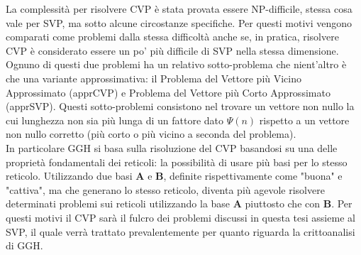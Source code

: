 La complessità per risolvere CVP è stata provata essere NP-difficile\cite{CVP-NP09}, stessa
cosa vale per SVP, ma sotto alcune circostanze specifiche\cite{SVP-NP02}. Per questi motivi vengono
comparati come problemi dalla stessa difficoltà anche se, in pratica, risolvere CVP è considerato 
essere un po' più difficile di SVP nella stessa dimensione.
Ognuno di questi due problemi ha un relativo sotto-problema che nient'altro è che una 
variante approssimativa: il Problema del Vettore più Vicino Approssimato (apprCVP) 
e Problema del Vettore più Corto Approssimato  (apprSVP). Questi sotto-problemi consistono nel 
trovare un vettore non nullo la cui lunghezza non sia più lunga di un fattore dato $\Psi(n)$
rispetto a un vettore non nullo corretto (più corto o più vicino a seconda del problema).
\\
In particolare GGH si basa sulla risoluzione del CVP basandosi su una delle proprietà
fondamentali dei reticoli: la possibilità di usare più basi per lo stesso reticolo.
Utilizzando due basi $\mathbf{A}$ e $\mathbf{B}$, definite rispettivamente come 
"buona" e "cattiva", ma che generano lo stesso reticolo, diventa più agevole 
risolvere determinati problemi sui reticoli utilizzando la base $\mathbf{A}$ piuttosto 
che con $\mathbf{B}$. 
Per questi motivi il CVP sarà il fulcro dei problemi discussi in questa tesi assieme al SVP,
il quale verrà trattato prevalentemente per quanto riguarda la crittoanalisi di GGH. 